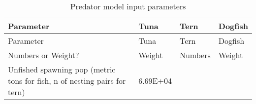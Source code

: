 \documentclass[]{article}
\begin{document}
\begin{longtable}[]{@{}llll@{}}
\caption{Predator model input parameters\label{predpars}}\tabularnewline
\toprule
\begin{minipage}[b]{0.56\columnwidth}\raggedright\strut
Parameter\strut
\end{minipage} & \begin{minipage}[b]{0.11\columnwidth}\raggedright\strut
Tuna\strut
\end{minipage} & \begin{minipage}[b]{0.11\columnwidth}\raggedright\strut
Tern\strut
\end{minipage} & \begin{minipage}[b]{0.11\columnwidth}\raggedright\strut
Dogfish\strut
\end{minipage}\tabularnewline
\midrule
\endfirsthead
\toprule
\begin{minipage}[b]{0.56\columnwidth}\raggedright\strut
Parameter\strut
\end{minipage} & \begin{minipage}[b]{0.11\columnwidth}\raggedright\strut
Tuna\strut
\end{minipage} & \begin{minipage}[b]{0.11\columnwidth}\raggedright\strut
Tern\strut
\end{minipage} & \begin{minipage}[b]{0.11\columnwidth}\raggedright\strut
Dogfish\strut
\end{minipage}\tabularnewline
\midrule
\endhead
\begin{minipage}[t]{0.56\columnwidth}\raggedright\strut
Numbers or Weight?\strut
\end{minipage} & \begin{minipage}[t]{0.11\columnwidth}\raggedright\strut
Weight\strut
\end{minipage} & \begin{minipage}[t]{0.11\columnwidth}\raggedright\strut
Numbers\strut
\end{minipage} & \begin{minipage}[t]{0.11\columnwidth}\raggedright\strut
Weight\strut
\end{minipage}\tabularnewline
\begin{minipage}[t]{0.56\columnwidth}\raggedright\strut
Unfished spawning pop (metric tons for fish, n of nesting pairs for
tern)\strut
\end{minipage} & \begin{minipage}[t]{0.11\columnwidth}\raggedright\strut
6.69E+04\strut
\end{minipage} & \begin{minipage}[t]{0.11\columnwidth}\raggedright\strut

\end{minipage}
\end{longtable}
\end{document}
